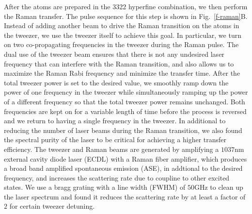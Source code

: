\documentclass[aps,prl,twocolumn,groupedaddress]{revtex4-1}
\begin{document}
After the atoms are prepared in the 3322 hyperfine combination, we then perform the Raman transfer. The pulse sequence for this step is shown in Fig.~\ref{f-raman}B. Instead of adding another beam to drive the Raman transition on the atoms in the tweezer, we use the tweezer itself to achieve this goal. In particular, we turn on two co-propagating frequencies in the tweezer during the Raman pulse. The dual use of the tweezer beam ensures that there is not any undesired laser frequency that can interfere with the Raman transition, and also allows us to maximize the Raman Rabi frequency and minimize the transfer time. After the total tweezer power is set to the desired value, we smoothly ramp down the power of one frequency in the tweezer while simultaneously ramping up the power of a different frequency so that the total tweezer power remains unchanged. Both frequencies are kept on for a variable length of time before the process is reversed and we return to having a single frequency in the tweezer.
In additional to reducing the number of laser beams during the Raman transition,
we also found the spectral purity of the laser to be critical for achieving a higher
transfer efficiency. The tweezer and Raman beams are generated by amplifying a $1037 \mathrm{nm}$
external cavity diode laser (ECDL) with a Raman fiber amplifier,
which produces a broad band amplified spontaneous emission (ASE),
in addtional to the desired frequency, and increases the scattering rate due to coupline to
other excited states.
We use a bragg grating with a line width (FWHM) of $50 \mathrm{GHz}$ to clean up the
laser spectrum and found it reduces the scattering rate by at least a factor of $2$
for certain tweezer detuning.

\end{document}
